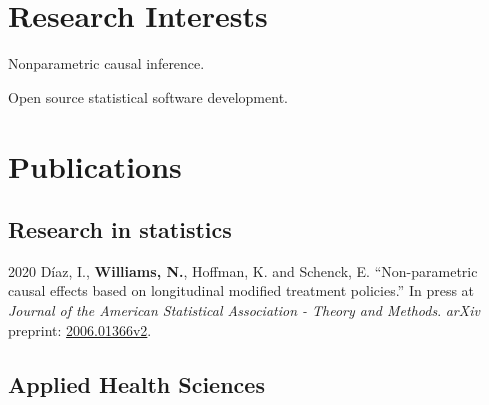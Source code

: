 \documentclass[12pt,letterpaper]{report}
\newcommand{\listitemspace}{0.15em}
\renewenvironment{itemize}
{\begin{list}{}{\setlength{\leftmargin}{0em}
            \setlength{\parskip}{0em}
            \setlength{\itemsep}{\listitemspace}
            \setlength{\parsep}{\listitemspace}}}
    {\end{list}}
\begin{document}
    \section*{Research Interests}

    \begin{itemize}

        \item Nonparametric causal inference.

        \item Open source statistical software development.

    \end{itemize}

    \section*{Publications}
    
    \subsection*{Research in statistics}
    
    \begin{tablist}
    
       \item[2020] \tab Díaz, I., \textbf{Williams, N.}, Hoffman, K. and Schenck, E. \enquote{Non-parametric causal effects based on longitudinal modified treatment policies.} In press at \textit{Journal of the American Statistical Association - Theory and Methods}. \textit{arXiv} preprint: \href{https://arxiv.org/abs/2006.01366v2}{2006.01366v2}.
       
    \end{tablist}

    \subsection*{Applied Health Sciences}
\end{document}
